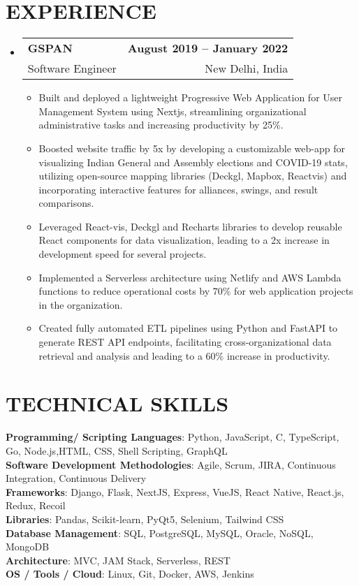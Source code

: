 \documentclass[letterpaper,10pt]{article}
\makeatletter
\newcommand{\resumeItem}[1]{
  \item\small{
    {#1 \vspace{-2pt}}
  }
}
\newcommand{\resumeSubheading}[4]{
  \vspace{-2pt}\item
    \begin{tabular*}{1.0\textwidth}[t]{l@{\extracolsep{\fill}}r}
      \textbf{#1} & \textbf{\small #2} \\
      {\small#3} & {\small #4} \\
    \end{tabular*}\vspace{-7pt}
}
\newcommand{\resumeSubHeadingListStart}{\begin{itemize}[leftmargin=0.0in, label={}]}
\newcommand{\resumeSubHeadingListEnd}{\end{itemize}}
\newcommand{\resumeItemListStart}{\begin{itemize}}
\newcommand{\resumeItemListEnd}{\end{itemize}\vspace{-5pt}}
\makeatother
\begin{document}
\section{EXPERIENCE}
  \resumeSubHeadingListStart
    \resumeSubheading
      {GSPAN}{August 2019 -- January 2022}
      {Software Engineer}{New Delhi, India}
      \resumeItemListStart
        \resumeItem{Built and deployed a lightweight Progressive Web Application for User Management System using Nextjs, streamlining organizational administrative tasks and increasing productivity by 25\%.}
        \resumeItem{Boosted website traffic by 5x by developing a customizable web-app for visualizing Indian General and Assembly elections and COVID-19 stats, utilizing open-source mapping libraries (Deckgl, Mapbox, Reactvis) and incorporating interactive features for alliances, swings, and result comparisons.}
        \resumeItem{Leveraged React-vis, Deckgl and Recharts libraries to develop reusable React components for data visualization, leading to a 2x increase in development speed for several projects.}
        \resumeItem{Implemented a Serverless architecture using Netlify and AWS Lambda functions to reduce operational costs by 70\% for web application projects in the organization.}
        \resumeItem{Created fully automated ETL pipelines using Python and FastAPI to generate REST API endpoints, facilitating cross-organizational data retrieval and analysis and leading to a 60\% increase in productivity.}
      \resumeItemListEnd
  \resumeSubHeadingListEnd

\section{TECHNICAL SKILLS}
 \begin{itemize}[leftmargin=0.15in, label={}]
    \small{\item{
     \textbf{Programming/ Scripting Languages}: \hspace{21pt} Python, JavaScript, C, TypeScript, Go, Node.js,HTML, CSS, Shell Scripting, GraphQL \\[2pt]
     \textbf{Software Development Methodologies}: \hspace{10pt} Agile, Scrum, JIRA, Continuous Integration, Continuous Delivery \\[2pt]
     \textbf{Frameworks}: \hspace{115pt} Django, Flask, NextJS, Express, VueJS, React Native, React.js, Redux, Recoil \\[2pt]
     \textbf{Libraries}: \hspace{129pt} Pandas, Scikit-learn, PyQt5, Selenium, Tailwind CSS\\[2pt]
     \textbf{Database Management}: \hspace{71pt} SQL, PostgreSQL, MySQL, Oracle, NoSQL, MongoDB\\[2pt]
     \textbf{Architecture}: \hspace{115pt} MVC, JAM Stack, Serverless, REST\\[2pt]
     \textbf{OS / Tools / Cloud}: \hspace{93pt} Linux, Git, Docker, AWS, Jenkins
    }}
 \end{itemize}
\end{document}

